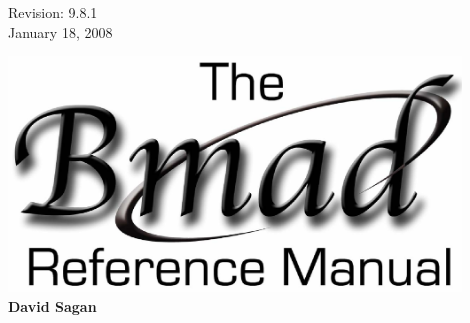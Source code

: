 \thispagestyle{empty}

\begin{flushright}
\large
  Revision: 9.8.1 \\
  January 18, 2008 \\
\end{flushright}

\vfill

{
\begin{center}
\includegraphics[width=12cm]{bmad-ref-manual.eps} \\
\vskip 0.3in
\huge\bf David Sagan
\end{center}
}

\vfill
\break

